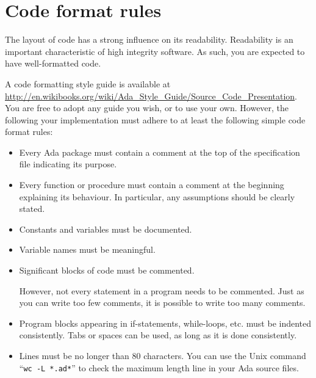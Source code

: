 \section{Code format rules}
\label{app:code-format-rules}

The layout of code has a strong influence on its readability. Readability is an important characteristic of high integrity software. As such, you are expected to have well-formatted code. 

A code formatting style guide is available at \url{http://en.wikibooks.org/wiki/Ada_Style_Guide/Source_Code_Presentation}. You are free to adopt any guide you wish, or to use your own. However, the following your implementation must adhere to at least the following simple code format rules:

\begin{itemize}[topsep=0mm,itemsep=1mm]

\item Every Ada package must contain a comment at the top of the specification file indicating its purpose.

\item Every function or procedure must contain a comment at the beginning explaining its behaviour. In particular, any assumptions should be clearly stated.

\item Constants and variables must be documented.

\item Variable names must be meaningful.

\item Significant blocks of code must be commented.

However, not every statement in a program needs to be commented. Just as you can write too few comments, it is possible to write too many comments.

\item Program blocks appearing in if-statements, while-loops, etc. must be indented consistently. Tabs or spaces can be used, as long as it is done consistently.

\item Lines must be no longer than 80 characters. You can use the Unix command ``\texttt{wc -L *.ad*}'' to check the maximum length line in your Ada source files.

\end{itemize} 

